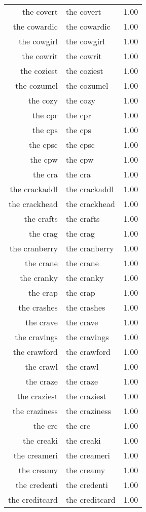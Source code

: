 \begin{table}[ht]
\begin{tabular}{rlr}
  the covert & the covert & 1.00 \\ 
  the cowardic & the cowardic & 1.00 \\ 
  the cowgirl & the cowgirl & 1.00 \\ 
  the cowrit & the cowrit & 1.00 \\ 
  the coziest & the coziest & 1.00 \\ 
  the cozumel & the cozumel & 1.00 \\ 
  the cozy & the cozy & 1.00 \\ 
  the cpr & the cpr & 1.00 \\ 
  the cps & the cps & 1.00 \\ 
  the cpsc & the cpsc & 1.00 \\ 
  the cpw & the cpw & 1.00 \\ 
  the cra & the cra & 1.00 \\ 
  the crackaddl & the crackaddl & 1.00 \\ 
  the crackhead & the crackhead & 1.00 \\ 
  the crafts & the crafts & 1.00 \\ 
  the crag & the crag & 1.00 \\ 
  the cranberry & the cranberry & 1.00 \\ 
  the crane & the crane & 1.00 \\ 
  the cranky & the cranky & 1.00 \\ 
  the crap & the crap & 1.00 \\ 
  the crashes & the crashes & 1.00 \\ 
  the crave & the crave & 1.00 \\ 
  the cravings & the cravings & 1.00 \\ 
  the crawford & the crawford & 1.00 \\ 
  the crawl & the crawl & 1.00 \\ 
  the craze & the craze & 1.00 \\ 
  the craziest & the craziest & 1.00 \\ 
  the craziness & the craziness & 1.00 \\ 
  the crc & the crc & 1.00 \\ 
  the creaki & the creaki & 1.00 \\ 
  the creameri & the creameri & 1.00 \\ 
  the creamy & the creamy & 1.00 \\ 
  the credenti & the credenti & 1.00 \\ 
  the creditcard & the creditcard & 1.00 \\ 

\end{tabular}
\end{table}
